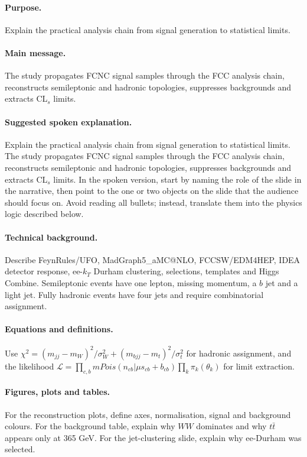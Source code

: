 \documentclass[11pt,a4paper]{report}
\newcommand{\ttbar}{t\bar t}
\begin{document}
\paragraph{Purpose.}
Explain the practical analysis chain from signal generation to statistical limits.

\paragraph{Main message.}
The study propagates FCNC signal samples through the FCC analysis chain, reconstructs semileptonic and hadronic topologies, suppresses backgrounds and extracts CL$_s$ limits.

\paragraph{Suggested spoken explanation.}
Explain the practical analysis chain from signal generation to statistical limits. The study propagates FCNC signal samples through the FCC analysis chain, reconstructs semileptonic and hadronic topologies, suppresses backgrounds and extracts CL$_s$ limits. In the spoken version, start by naming the role of the slide in the narrative, then point to the one or two objects on the slide that the audience should focus on.  Avoid reading all bullets; instead, translate them into the physics logic described below.

\paragraph{Technical background.}
Describe FeynRules/UFO, MadGraph5\_aMC@NLO, FCCSW/EDM4HEP, IDEA detector response, ee-$k_T$ Durham clustering, selections, templates and Higgs Combine.  Semileptonic events have one lepton, missing momentum, a $b$ jet and a light jet.  Fully hadronic events have four jets and require combinatorial assignment.

\paragraph{Equations and definitions.}
Use $\chi^2=(m_{jj}-m_W)^2/\sigma_W^2+(m_{bjj}-m_t)^2/\sigma_t^2$ for hadronic assignment, and the likelihood $\mathcal L=\prod_{c,b}{
m Pois}(n_{cb}|\mu s_{cb}+b_{cb})\prod_k\pi_k(\theta_k)$ for limit extraction.

\paragraph{Figures, plots and tables.}
For the reconstruction plots, define axes, normalisation, signal and background colours.  For the background table, explain why $WW$ dominates and why $\ttbar$ appears only at 365 GeV.  For the jet-clustering slide, explain why ee-Durham was selected.
\end{document}
